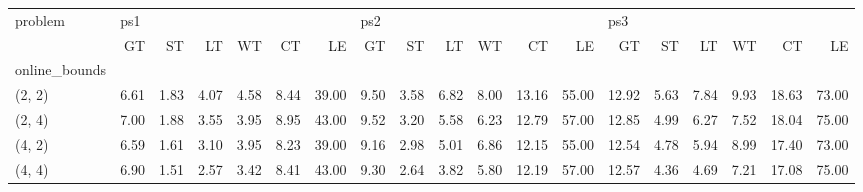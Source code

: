 \begin{tabular}{lrrrrrrrrrrrrrrrrrr}
\toprule
problem & \multicolumn{6}{l}{ps1} & \multicolumn{6}{l}{ps2} & \multicolumn{6}{l}{ps3} \\
{} &   GT &   ST &   LT &   WT &   CT &    LE &   GT &   ST &   LT &   WT &    CT &    LE &    GT &   ST &   LT &   WT &    CT &    LE \\
online\_bounds &      &      &      &      &      &       &      &      &      &      &       &       &       &      &      &      &       &       \\
\midrule
(2, 2)        & 6.61 & 1.83 & 4.07 & 4.58 & 8.44 & 39.00 & 9.50 & 3.58 & 6.82 & 8.00 & 13.16 & 55.00 & 12.92 & 5.63 & 7.84 & 9.93 & 18.63 & 73.00 \\
(2, 4)        & 7.00 & 1.88 & 3.55 & 3.95 & 8.95 & 43.00 & 9.52 & 3.20 & 5.58 & 6.23 & 12.79 & 57.00 & 12.85 & 4.99 & 6.27 & 7.52 & 18.04 & 75.00 \\
(4, 2)        & 6.59 & 1.61 & 3.10 & 3.95 & 8.23 & 39.00 & 9.16 & 2.98 & 5.01 & 6.86 & 12.15 & 55.00 & 12.54 & 4.78 & 5.94 & 8.99 & 17.40 & 73.00 \\
(4, 4)        & 6.90 & 1.51 & 2.57 & 3.42 & 8.41 & 43.00 & 9.30 & 2.64 & 3.82 & 5.80 & 12.19 & 57.00 & 12.57 & 4.36 & 4.69 & 7.21 & 17.08 & 75.00 \\
\bottomrule
\end{tabular}
